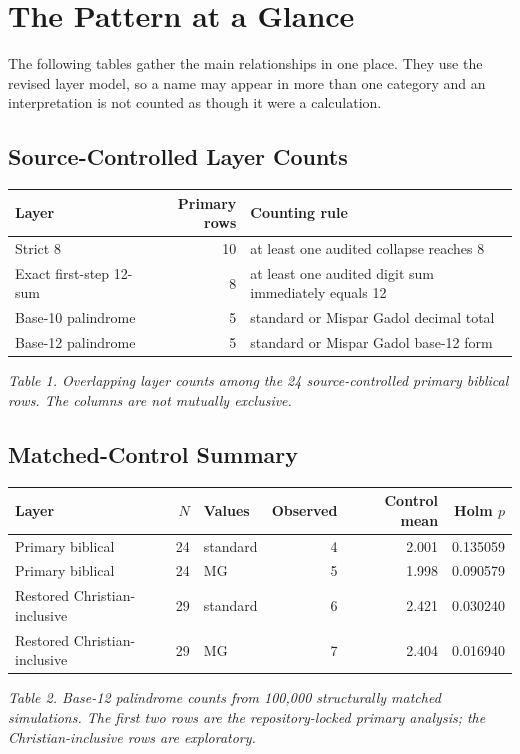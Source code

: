 \section{The Pattern at a Glance}

The following tables gather the main relationships in one place. They use the revised layer model, so a name may appear in more than one category and an interpretation is not counted as though it were a calculation.

\subsection{Source-Controlled Layer Counts}

\begin{center}
\begin{minipage}{0.94\linewidth}
\centering
\small
\begin{tabular}{lrl}
\toprule
Layer & Primary rows & Counting rule \\
\midrule
Strict 8 & 10 & at least one audited collapse reaches 8 \\
Exact first-step 12-sum & 8 & at least one audited digit sum immediately equals 12 \\
Base-10 palindrome & 5 & standard or Mispar Gadol decimal total \\
Base-12 palindrome & 5 & standard or Mispar Gadol base-12 form \\
\bottomrule
\end{tabular}

\smallskip
\textit{Table 1. Overlapping layer counts among the 24 source-controlled primary biblical rows. The columns are not mutually exclusive.}
\end{minipage}
\end{center}

\subsection{Matched-Control Summary}

\begin{center}
\begin{minipage}{0.96\linewidth}
\centering
\footnotesize
\begin{tabular}{lrlrrr}
\toprule
Layer & $N$ & Values & Observed & Control mean & Holm $p$ \\
\midrule
Primary biblical & 24 & standard & 4 & 2.001 & 0.135059 \\
Primary biblical & 24 & MG & 5 & 1.998 & 0.090579 \\
Restored Christian-inclusive & 29 & standard & 6 & 2.421 & 0.030240 \\
Restored Christian-inclusive & 29 & MG & 7 & 2.404 & 0.016940 \\
\bottomrule
\end{tabular}

\smallskip
\textit{Table 2. Base-12 palindrome counts from 100,000 structurally matched simulations. The first two rows are the repository-locked primary analysis; the Christian-inclusive rows are exploratory.}
\end{minipage}
\end{center}

